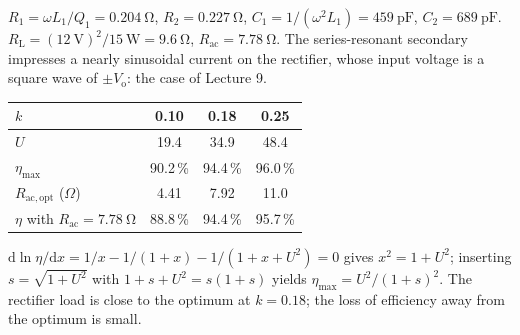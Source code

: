 


\begin{solutionblock}
	$R_1=\omega L_1/Q_1=\SI{0.204}{\ohm}$, $R_2=\SI{0.227}{\ohm}$, $C_1=1/(\omega^2L_1)=\SI{459}{\pico\farad}$, $C_2=\SI{689}{\pico\farad}$. $R_\mathrm{L}=(\SI{12}{\volt})^2/\SI{15}{\watt}=\SI{9.6}{\ohm}$, $R_\mathrm{ac}=\SI{7.78}{\ohm}$. The series-resonant secondary impresses a nearly sinusoidal current on the rectifier, whose input voltage is a square wave of $\pm V_\mathrm{o}$: the case of Lecture 9.
\end{solutionblock}


\begin{solutionblock}
	\begin{center}
		\begin{tabular}{|l|c|c|c|}
			\hline
			$k$                                   & 0.10   & 0.18   & 0.25   \\
			\hline
			$U$                                   & 19.4   & 34.9   & 48.4   \\
			$\eta_\mathrm{max}$                   & 90.2\,\% & 94.4\,\% & 96.0\,\% \\
			$R_\mathrm{ac,opt}$ ($\Omega$)        & 4.41   & 7.92   & 11.0   \\
			$\eta$ with $R_\mathrm{ac}=\SI{7.78}{\ohm}$ & 88.8\,\% & 94.4\,\% & 95.7\,\% \\
			\hline
		\end{tabular}
		\label{tab:ex10_link}
	\end{center}
	$\mathrm{d}\ln\eta/\mathrm{d}x=1/x-1/(1+x)-1/(1+x+U^2)=0$ gives $x^2=1+U^2$; inserting $s=\sqrt{1+U^2}$ with $1+s+U^2=s(1+s)$ yields $\eta_\mathrm{max}=U^2/(1+s)^2$. The rectifier load is close to the optimum at $k=0.18$; the loss of efficiency away from the optimum is small.
\end{solutionblock}


